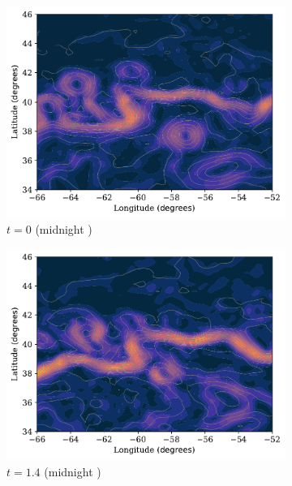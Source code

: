 \begin{figure}
	\begin{center}
		\begin{subfigure}{0.49\textwidth}
			\includegraphics[width=\textwidth]{chp02_background/figures/gulf_stream_motivation/streamlines_0}
			\caption{\(t = 0\) (midnight )}
		\end{subfigure}
		\begin{subfigure}{0.49\textwidth}
			\includegraphics[width=\textwidth]{chp02_background/figures/gulf_stream_motivation/streamlines_1.pdf}
			\caption{\(t = 1.4\) (midnight )}
		\end{subfigure}
		\begin{subfigure}{0.49\textwidth}

\end{subfigure}
\end{center}
\end{figure}
